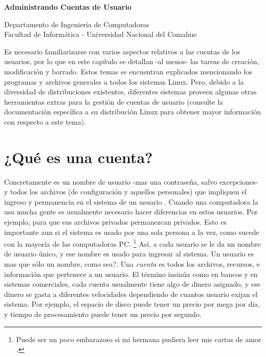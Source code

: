 \documentclass[12pt]{article}
\def\maketitle{

 \makeatletter
 {\color{bl} \centering \huge \sc \textbf{
Administrando Cuentas de Usuario \\
 \vspace*{8pt} }\par}
 \makeatother


 \makeatletter
 {\centering \small 
 	Departamento de Ingeniería de Computadoras \\
 	Facultad de Informática - Universidad Nacional del Comahue \\
 	\vspace{20pt} }
 \makeatother

}
\begin{document}
\thispagestyle{empty}
\maketitle
\setlength{\parindent}{0pt}





Es necesario familiarizarse con varios aspectos relativos a las
cuentas de los usuarios, por lo que en este capítulo se detallan 
-al menos- las tareas de creación, modificación y borrado.
Estos temas se encuentran explicados
mencionando los programas y archivos generales a todos los sistemas Linux.
Pero, debido a la diversidad de distribuciones existentes,
diferentes sistemas proveen algunas otras herramientas extras para la gestión de cuentas de usuario (consulte la documentación
específica a su distribución Linux para obtener mayor información con 
respecto a este tema).

		
\section{ ¿Qué es una cuenta?}

Concretamente es un nombre de usuario -mas una contraseña, salvo
excepciones- y todos los archivos (de configuración y aquellos personales) que
impliquen el ingreso y permanencia en el sistema  de un usuario .
Cuando una computadora la usa mucha gente es usualmente necesario hacer
diferencias en estos usuarios. Por ejemplo, para que sus archivos privados
permanezcan privados. Esto es importante aun si el sistema es usado por una
sola persona a la vez, como sucede con la mayoría de las computadoras PC.
		\footnote{
 Puede ser un poco embarazoso si mi hermana pudiera leer mis cartas de amor
		.} Así, a cada
		usuario se le da un nombre de usuario único, y ese nombre es
		usado para ingresar al sistema. Un usuario es mas
		que sólo un nombre, como sea?. Una \textit{cuenta}
		es todos los archivos, recursos, e información que pertenece a
		un usuario. El término insinúa como en bancos y en sistemas
		comerciales, cada cuenta usualmente tiene algo de dinero
		asignado, y ese dinero se gasta a diferentes velocidades
		dependiendo de cuantos usuario exijan el sistema. Por ejemplo,
		el espacio de disco puede tener un precio por mega por día, y
		tiempo de procesamiento puede tener un precio por
		segundo.
\end{document}
